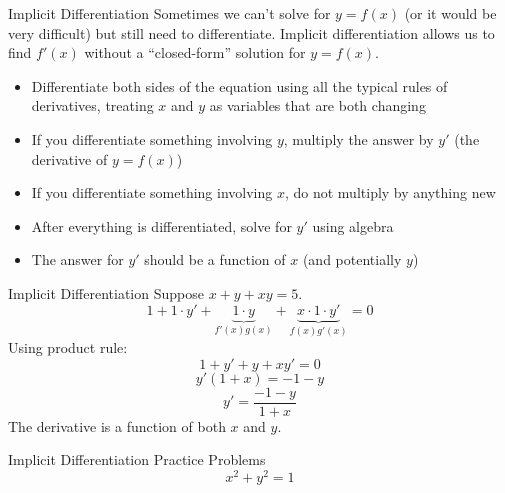 \documentclass[aspectratio=169]{beamer}
\begin{document}
\begin{frame}{Implicit Differentiation}\label{main1}
    Sometimes we can’t solve for $y = f(x)$ (or it would be very difficult) but still need to differentiate. Implicit differentiation allows us to find $f'(x)$ without a “closed-form” solution for $y = f(x)$.
    \begin{itemize}
    \begin{itemize}
        \item Differentiate both sides of the equation using all the typical rules of derivatives, treating $x$ and $y$ as variables that are both changing
        \item If you differentiate something involving $y$, multiply the answer by $y'$ (the derivative of $y = f(x)$)
        \item If you differentiate something involving $x$, do not multiply by anything new
        \item After everything is differentiated, solve for $y'$ using algebra
        \item The answer for $y'$ should be a function of $x$ (and potentially $y$)
    \end{itemize}
    \end{itemize}
\end{frame}

\begin{frame}{Implicit Differentiation}\label{main1}
    Suppose $x + y + xy = 5$.
    \[
    1 + 1 \cdot y' + \underbrace{1 \cdot y}_{f'(x)g(x)} + \underbrace{x \cdot 1 \cdot y'}_{f(x)g'(x)} = 0
    \]
    Using product rule:
    \[
    1 + y' + y + xy' = 0
    \]
    \[
    y'(1 + x) = -1 - y
    \]
    \[
    y' = \frac{-1 - y}{1 + x}
    \]
    The derivative is a function of both $x$ and $y$.
\end{frame}

\begin{frame}{Implicit Differentiation Practice Problems}\label{main1}
	\vspace{-4cm}
     \[
    x^{2} + y^{2} = 1
    \]
\end{frame}
\end{document}
